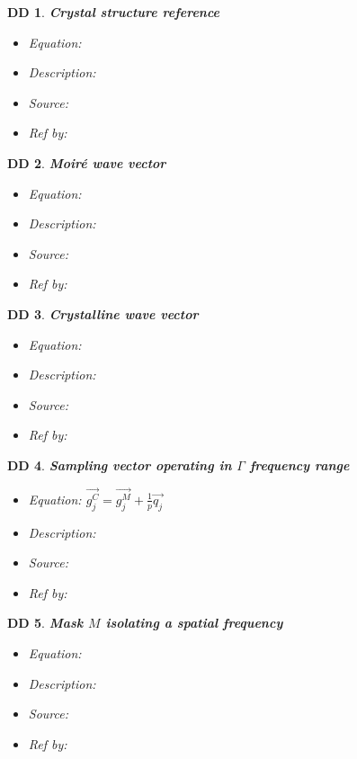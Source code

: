 \documentclass[12pt]{article}
\newtheorem{DD}{DD}
\begin{document}
\begin{DD}
\normalfont \textbf{Crystal structure reference}
\begin{itemize}
\item Equation:
\item Description:
\item Source:
\item Ref by:
\end{itemize}
\label{DD_2}
\end{DD}

\begin{DD}
\normalfont \textbf{Moir{\'e} wave vector}
\begin{itemize}
\item Equation:
\item Description:
\item Source:
\item Ref by:
\end{itemize}
\label{DD_3}
\end{DD}

\begin{DD}
\normalfont \textbf{Crystalline wave vector}
\begin{itemize}
\item Equation:
\item Description:
\item Source:
\item Ref by:
\end{itemize}
\label{DD_4}
\end{DD}

\begin{DD}
\normalfont \textbf{Sampling vector operating in $\Gamma$ frequency range}
\begin{itemize}
\item Equation: $\overrightarrow{g_{j}^{C}}=\overrightarrow{g_{j}^{M}}+\frac{1}{p}\overrightarrow{q_{j}}$
\item Description:
\item Source:
\item Ref by:
\end{itemize}
\label{DD_5}
\end{DD}

\begin{DD}
\normalfont \textbf{Mask $M$ isolating a spatial frequency}
\begin{itemize}
\item Equation:
\item Description:
\item Source:
\item Ref by:
\end{itemize}
\label{DD_6}
\end{DD}
\end{document}

